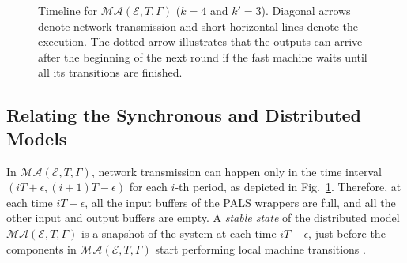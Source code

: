 \begin{figure}
\begin{center}
\caption{Timeline for $\mathcal{MA}(\mathcal{E}, T, \Gamma)$ ($k=4$ and $k' = 3$).
Diagonal arrows denote network transmission and short horizontal lines denote the execution.
The dotted arrow illustrates that the outputs can arrive after the beginning of the next round 
if the fast machine waits until all its transitions are finished.
\label{fig:mr-timeline}}
\end{center}
\end{figure} 



\subsection{Relating the Synchronous and Distributed Models}

In  $\mathcal{MA}(\mathcal{E}, T, \Gamma)$,
network transmission can happen only in the time interval  $(iT+\epsilon, (i+1)T-\epsilon)$
for each $i$-th period, as depicted in Fig.~\ref{fig:mr-timeline}.
Therefore, at each time $iT - \epsilon$, all the input buffers of the PALS wrappers are full, 
and all the other input and output buffers are empty.
A \emph{stable state} of the distributed model $\mathcal{MA}(\mathcal{E}, T, \Gamma)$
is a snapshot of the system at each time $iT - \epsilon$,
just before the components in $\mathcal{MA}(\mathcal{E}, T, \Gamma)$ 
start performing local machine transitions \cite{pals-tcs}.



